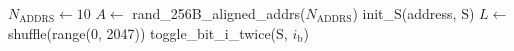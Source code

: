 \begin{algorithm}[t]
\footnotesize
\caption{1-bit, uniform $\mathrm{S}$, test pattern generation \label{alg:1bit}}
\begin{algorithmic}[1]
\State $N_{\text{ADDRS}} \gets 10$
\State $A \gets$ rand\_256B\_aligned\_addrs($N_{\text{ADDRS}}$)
        \State init\_$\mathrm{S}$(address, $\mathrm{S}$) 
        \State $L \gets$ shuffle(range(0, 2047))
            \State toggle\_bit\_i\_twice($\mathrm{S}$, $i_{\text{b}}$) 
        \EndFor
    \EndFor
\EndFor
\end{algorithmic}
\end{algorithm}
